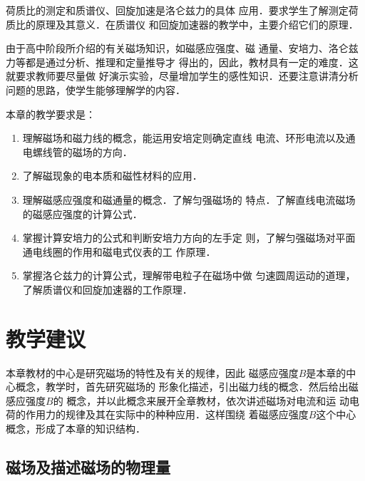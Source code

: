 荷质比的测定和质谱仪、回旋加速是洛仑兹力的具体
应用．要求学生了解测定荷质比的原理及其意义．在质谱仪
和回旋加速器的教学中，主要介绍它们的原理．

由于高中阶段所介绍的有关磁场知识，如磁感应强度、磁
通量、安培力、洛仑兹力等都是通过分析、推理和定量推导才
得出的，因此，教材具有一定的难度．这就要求教师要尽量做
好演示实验，尽量增加学生的感性知识．还要注意讲清分析
问题的思路，使学生能够理解学的内容．

本章的教学要求是：
\begin{enumerate}
\item 理解磁场和磁力线的概念，能运用安培定则确定直线
电流、环形电流以及通电螺线管的磁场的方向．
\item 了解磁现象的电本质和磁性材料的应用．
\item 理解磁感应强度和磁通量的概念．了解匀强磁场的
特点．了解直线电流磁场的磁感应强度的计算公式．
\item 掌握计算安培力的公式和判断安培力方向的左手定
则，了解匀强磁场对平面通电线圈的作用和磁电式仪表的工
作原理．
\item 掌握洛仑兹力的计算公式，理解带电粒子在磁场中做
匀速圆周运动的道理，了解质谱仪和回旋加速器的工作原理．
\end{enumerate}

\section{教学建议}
本章教材的中心是研究磁场的特性及有关的规律，因此
磁感应强度$B$是本章的中心概念，教学时，首先研究磁场的
形象化描述，引出磁力线的概念．然后给出磁感应强度$B$的
概念，并以此概念来展开全章教材，依次讲述磁场对电流和运
动电荷的作用力的规律及其在实际中的种种应用．这样围绕
着磁感应强度$B$这个中心概念，形成了本章的知识结构．

\subsection{磁场及描述磁场的物理量}

